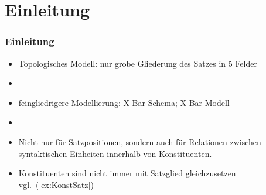\section{Einleitung}

\begin{frame}
\frametitle{Einleitung}

\begin{itemize}
	\item Topologisches Modell: nur grobe Gliederung des Satzes in 5 Felder
	\item[]	
	\item feingliedrigere Modellierung: X-Bar-Schema; X-Bar-Modell
	\item[]
	\item Nicht nur für Satzpositionen, sondern auch für Relationen zwischen syntaktischen Einheiten innerhalb von Konstituenten.


\eal 
{}
 \label{ex:KonstSatz}
\zl

	\item Konstituenten sind nicht immer mit Satzglied gleichzusetzen vgl.\ (\ref{ex:KonstSatz})
	
\end{itemize}

\end{frame}


